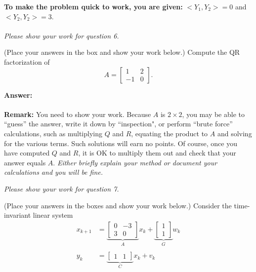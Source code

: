 \documentclass[letterpaper]{article}
\begin{document}
\noindent \textbf{To make the problem quick to work, you are given:} $<Y_1,Y_2>=0$ and $<Y_2,Y_2>=3$. \\

\\



\newpage
\textit{Please show your work for question 6.}


\newpage

  (Place your answers in the box and show your work below.) Compute the QR factorization of
$$A= \left[  \begin{array}{rr}  1&   2\\  -1 & 0\end{array} \right] .$$

\noindent \textbf{Answer:} \\ \\

\noindent \textbf{Remark:} You need to show your work. Because $A$ is $2 \times 2$, you may be able to ``guess'' the answer, write it down by ``inspection", or perform ``brute force'' calculations, such as multiplying $Q$ and $R$, equating the product to $A$ and solving for the various terms. Such solutions will earn no points. Of course, once you have computed $Q$ and $R$, it is OK to multiply them out and check that your answer equals $A$. \textit{Either briefly explain your method or document your calculations and you will be fine.}



\newpage
\textit{Please show your work for question 7.}
\newpage



   (Place your answers in the boxes and show your work below.) Consider  the time-invariant linear system
  \begin{align*}
  x_{k+1} &= \underbrace{\left[ \begin{array}{rr} 0 & -3\\ 3 & 0\end{array} \right]}_{A} x_k + \underbrace{\left[ \begin{array}{c} 1 \\ 1\end{array} \right]}_{G} w_k \\
  \\
  y_k &=   \underbrace{\left[ \begin{array}{cc} 1 & 1\end{array} \right]}_{C} x_k + v_k
  \end{align*}
\end{document}
